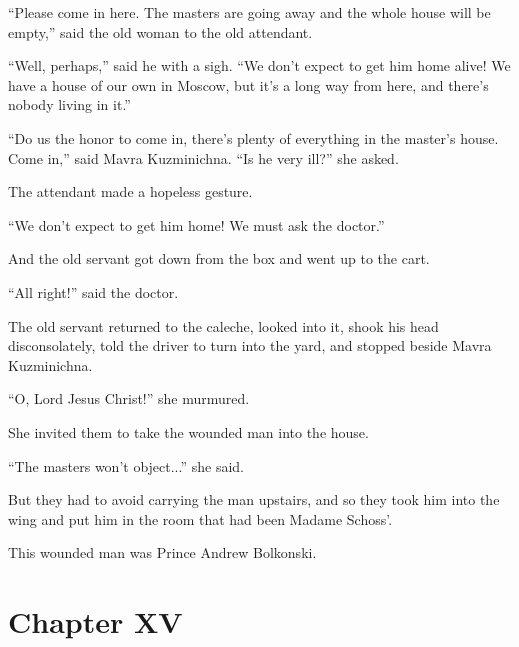 ``Please come in here. The masters are going away and the whole
house will be empty,'' said the old woman to the old attendant.

``Well, perhaps,'' said he with a sigh. ``We don't expect to get
him home alive! We have a house of our own in Moscow, but it's a
long way from here, and there's nobody living in it.''

``Do us the honor to come in, there's plenty of everything in the
master's house. Come in,'' said Mavra Kuzminichna. ``Is he very
ill?'' she asked.

The attendant made a hopeless gesture.

``We don't expect to get him home! We must ask the doctor.''

And the old servant got down from the box and went up to the
cart.

``All right!'' said the doctor.

The old servant returned to the caleche, looked into it, shook
his head disconsolately, told the driver to turn into the yard,
and stopped beside Mavra Kuzminichna.

``O, Lord Jesus Christ!'' she murmured.

She invited them to take the wounded man into the house.

``The masters won't object...'' she said.

But they had to avoid carrying the man upstairs, and so they took
him into the wing and put him in the room that had been Madame
Schoss'.

This wounded man was Prince Andrew Bolkonski.


\chapter*{Chapter XV} \ifaudio {}
\fi

